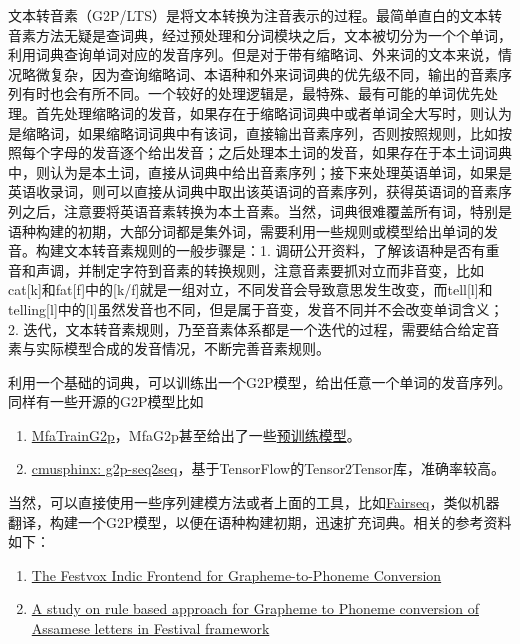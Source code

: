\documentclass[cn,10pt,math=newtx,citestyle=gb7714-2015,bibstyle=gb7714-2015]{elegantbook}
\begin{document}
文本转音素（G2P/LTS）是将文本转换为注音表示的过程。最简单直白的文本转音素方法无疑是查词典，经过预处理和分词模块之后，文本被切分为一个个单词，利用词典查询单词对应的发音序列。但是对于带有缩略词、外来词的文本来说，情况略微复杂，因为查询缩略词、本语种和外来词词典的优先级不同，输出的音素序列有时也会有所不同。一个较好的处理逻辑是，最特殊、最有可能的单词优先处理。首先处理缩略词的发音，如果存在于缩略词词典中或者单词全大写时，则认为是缩略词，如果缩略词词典中有该词，直接输出音素序列，否则按照规则，比如按照每个字母的发音逐个给出发音；之后处理本土词的发音，如果存在于本土词词典中，则认为是本土词，直接从词典中给出音素序列；接下来处理英语单词，如果是英语收录词，则可以直接从词典中取出该英语词的音素序列，获得英语词的音素序列之后，注意要将英语音素转换为本土音素。当然，词典很难覆盖所有词，特别是语种构建的初期，大部分词都是集外词，需要利用一些规则或模型给出单词的发音。构建文本转音素规则的一般步骤是：1. 调研公开资料，了解该语种是否有重音和声调，并制定字符到音素的转换规则，注意音素要抓对立而非音变，比如cat[k]和fat[f]中的[k/f]就是一组对立，不同发音会导致意思发生改变，而tell[l]和telling[l]中的[l]虽然发音也不同，但是属于音变，发音不同并不会改变单词含义；2. 迭代，文本转音素规则，乃至音素体系都是一个迭代的过程，需要结合给定音素与实际模型合成的发音情况，不断完善音素规则。

利用一个基础的词典，可以训练出一个G2P模型，给出任意一个单词的发音序列。同样有一些开源的G2P模型比如

\begin{enumerate}
  \item \href{https://montreal-forced-aligner.readthedocs.io/en/stable/model_training.html}{MfaTrainG2p}，MfaG2p甚至给出了一些\href{https://github.com/MontrealCorpusTools/mfa-models}{预训练模型}。
  \item \href{https://github.com/cmusphinx/g2p-seq2seq}{cmusphinx: g2p-seq2seq}，基于TensorFlow的Tensor2Tensor库，准确率较高。
\end{enumerate}

当然，可以直接使用一些序列建模方法或者上面的工具，比如\href{https://github.com/pytorch/fairseq}{Fairseq}，类似机器翻译，构建一个G2P模型，以便在语种构建初期，迅速扩充词典。相关的参考资料如下：

\begin{enumerate}
  \item \href{https://www.cs.cmu.edu/~awb/papers/LREC16_parlikar.pdf}{The Festvox Indic Frontend for Grapheme-to-Phoneme Conversion}
  \item \href{https://ieeexplore.ieee.org/document/7942536}{A study on rule based approach for Grapheme to Phoneme conversion of Assamese letters in Festival framework}
\end{enumerate}
\end{document}
